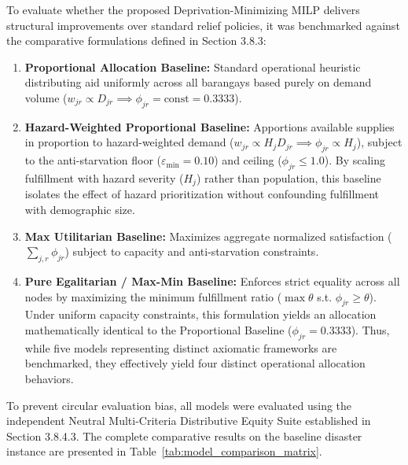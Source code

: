 To evaluate whether the proposed Deprivation-Minimizing MILP delivers structural improvements over standard relief policies, it was benchmarked against the comparative formulations defined in Section 3.8.3:
\begin{enumerate}
    \item \textbf{Proportional Allocation Baseline:} Standard operational heuristic distributing aid uniformly across all barangays based purely on demand volume ($w_{jr} \propto D_{jr} \implies \phi_{jr} = \text{const} = 0.3333$).
    \item \textbf{Hazard-Weighted Proportional Baseline:} Apportions available supplies in proportion to hazard-weighted demand ($w_{jr} \propto H_j D_{jr} \implies \phi_{jr} \propto H_j$), subject to the anti-starvation floor ($\varepsilon_{\min} = 0.10$) and ceiling ($\phi_{jr} \le 1.0$). By scaling fulfillment with hazard severity ($H_j$) rather than population, this baseline isolates the effect of hazard prioritization without confounding fulfillment with demographic size.
    \item \textbf{Max Utilitarian Baseline:} Maximizes aggregate normalized satisfaction ($\sum_{j,r} \phi_{jr}$) subject to capacity and anti-starvation constraints.
    \item \textbf{Pure Egalitarian / Max-Min Baseline:} Enforces strict equality across all nodes by maximizing the minimum fulfillment ratio ($\max \theta$ s.t. $\phi_{jr} \ge \theta$). Under uniform capacity constraints, this formulation yields an allocation mathematically identical to the Proportional Baseline ($\phi_{jr} = 0.3333$). Thus, while five models representing distinct axiomatic frameworks are benchmarked, they effectively yield four distinct operational allocation behaviors.
\end{enumerate}

To prevent circular evaluation bias, all models were evaluated using the independent Neutral Multi-Criteria Distributive Equity Suite established in Section 3.8.4.3. The complete comparative results on the baseline disaster instance are presented in Table~\ref{tab:model_comparison_matrix}.

